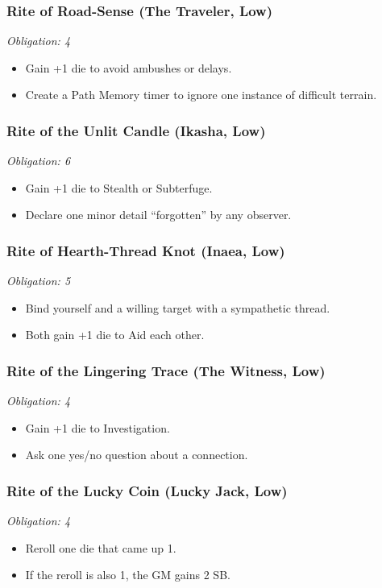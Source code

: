 \subsubsection*{Rite of Road-Sense (The Traveler, Low)}
\textit{Obligation: 4}
\begin{itemize}
  \item Gain +1 die to avoid ambushes or delays.
  \item Create a Path Memory timer to ignore one instance of difficult terrain.
\end{itemize}

\subsubsection*{Rite of the Unlit Candle (Ikasha, Low)}
\textit{Obligation: 6}
\begin{itemize}
  \item Gain +1 die to Stealth or Subterfuge.
  \item Declare one minor detail ``forgotten'' by any observer.
\end{itemize}

\subsubsection*{Rite of Hearth-Thread Knot (Inaea, Low)}
\textit{Obligation: 5}
\begin{itemize}
  \item Bind yourself and a willing target with a sympathetic thread.
  \item Both gain +1 die to Aid each other.
\end{itemize}

\subsubsection*{Rite of the Lingering Trace (The Witness, Low)}
\textit{Obligation: 4}
\begin{itemize}
  \item Gain +1 die to Investigation.
  \item Ask one yes/no question about a connection.
\end{itemize}

\subsubsection*{Rite of the Lucky Coin (Lucky Jack, Low)}
\textit{Obligation: 4}
\begin{itemize}
  \item Reroll one die that came up 1.
  \item If the reroll is also 1, the GM gains 2 SB.
\end{itemize}

